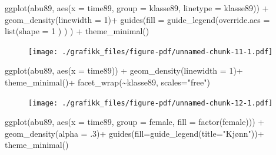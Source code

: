 \documentclass[
  letterpaper,
  DIV=11,
  numbers=noendperiod]{scrreprt}
\newenvironment{Shaded}{\begin{snugshade}}{\end{snugshade}}
\newcommand{\AttributeTok}[1]{\textcolor[rgb]{0.40,0.45,0.13}{#1}}
\newcommand{\DecValTok}[1]{\textcolor[rgb]{0.68,0.00,0.00}{#1}}
\newcommand{\FunctionTok}[1]{\textcolor[rgb]{0.28,0.35,0.67}{#1}}
\newcommand{\NormalTok}[1]{\textcolor[rgb]{0.00,0.23,0.31}{#1}}
\newcommand{\SpecialCharTok}[1]{\textcolor[rgb]{0.37,0.37,0.37}{#1}}
\newcommand{\StringTok}[1]{\textcolor[rgb]{0.13,0.47,0.30}{#1}}
\theoremstyle{definition}
\theoremstyle{remark}
\begin{document}
\begin{Shaded}
\begin{Highlighting}[]
\FunctionTok{ggplot}\NormalTok{(abu89, }\FunctionTok{aes}\NormalTok{(}\AttributeTok{x =}\NormalTok{ time89, }\AttributeTok{group =}\NormalTok{ klasse89, }\AttributeTok{linetype =}\NormalTok{ klasse89)) }\SpecialCharTok{+}
  \FunctionTok{geom\_density}\NormalTok{(}\AttributeTok{linewidth =} \DecValTok{1}\NormalTok{)}\SpecialCharTok{+}
  \FunctionTok{guides}\NormalTok{(}\AttributeTok{fill =} \FunctionTok{guide\_legend}\NormalTok{(}\AttributeTok{override.aes =} \FunctionTok{list}\NormalTok{(}\AttributeTok{shape =} \DecValTok{1}\NormalTok{ ) ) ) }\SpecialCharTok{+}
  \FunctionTok{theme\_minimal}\NormalTok{()}
\end{Highlighting}
\end{Shaded}

\begin{figure}[H]

{\centering \texttt{[image: ./grafikk\_files/figure-pdf/unnamed-chunk-11-1.pdf]}

}

\end{figure}

\begin{Shaded}
\begin{Highlighting}[]
\FunctionTok{ggplot}\NormalTok{(abu89, }\FunctionTok{aes}\NormalTok{(}\AttributeTok{x =}\NormalTok{ time89)) }\SpecialCharTok{+}
  \FunctionTok{geom\_density}\NormalTok{(}\AttributeTok{linewidth =} \DecValTok{1}\NormalTok{)}\SpecialCharTok{+}
  \FunctionTok{theme\_minimal}\NormalTok{()}\SpecialCharTok{+}
  \FunctionTok{facet\_wrap}\NormalTok{(}\SpecialCharTok{\textasciitilde{}}\NormalTok{klasse89, }\AttributeTok{scales=}\StringTok{"free"}\NormalTok{)}
\end{Highlighting}
\end{Shaded}

\begin{figure}[H]

{\centering \texttt{[image: ./grafikk\_files/figure-pdf/unnamed-chunk-12-1.pdf]}

}

\end{figure}

\begin{Shaded}
\begin{Highlighting}[]
\FunctionTok{ggplot}\NormalTok{(abu89, }\FunctionTok{aes}\NormalTok{(}\AttributeTok{x =}\NormalTok{ time89, }\AttributeTok{group =}\NormalTok{ female,  }\AttributeTok{fill =} \FunctionTok{factor}\NormalTok{(female))) }\SpecialCharTok{+}
  \FunctionTok{geom\_density}\NormalTok{(}\AttributeTok{alpha =}\NormalTok{ .}\DecValTok{3}\NormalTok{)}\SpecialCharTok{+}
  \FunctionTok{guides}\NormalTok{(}\AttributeTok{fill=}\FunctionTok{guide\_legend}\NormalTok{(}\AttributeTok{title=}\StringTok{"Kjønn"}\NormalTok{))}\SpecialCharTok{+}
  \FunctionTok{theme\_minimal}\NormalTok{()}
\end{Highlighting}
\end{Shaded}
\end{document}
